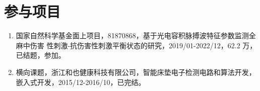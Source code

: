 {    \section*{参与项目}
    \begin{enumerate}
        \item 国家自然科学基金面上项目，81870868，基于光电容积脉搏波特征参数监测全麻中伤害
        性刺激-抗伤害性刺激平衡状态的研究，2019/01-2022/12，62.2 万，已结题，参加。
        \item 横向课题，浙江和也健康科技有限公司，智能床垫电子检测电路和算法开发，嵌入式开发，2015/12-2016/10，已完结。
    \end{enumerate}

    
    
    
    
    
    
    
}